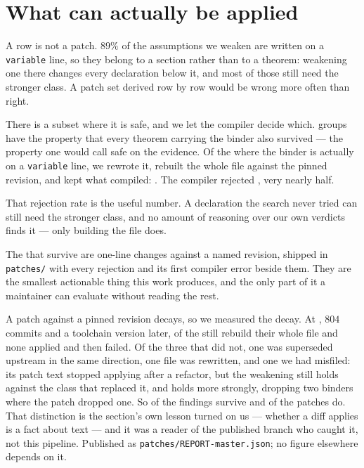 \documentclass[11pt]{article}
\begin{document}
\section{What can actually be applied}\label{sec:patches}

A row is not a patch. \(89\%\) of the assumptions we weaken are written on a
\texttt{variable} line, so they belong to a section rather than to a theorem:
weakening one there changes every declaration below it, and most of those still
need the stronger class. A patch set derived row by row would be wrong more
often than right.

There is a subset where it is safe, and we let the compiler decide which.
\patchGroups{} groups have the property that every theorem carrying the binder
also survived --- the property one would call safe on the evidence. Of the
\patchTested{} where the binder is actually on a \texttt{variable} line, we
rewrote it, rebuilt the whole file against the pinned revision, and kept what
compiled: \textbf{\patchKept{}}. The compiler rejected \patchRejected{}, very nearly
half.

That rejection rate is the useful number. A declaration the search never tried
can still need the stronger class, and no amount of reasoning over our own
verdicts finds it --- only building the file does.

The \patchKept{} that survive are one-line changes against a named revision,
shipped in \texttt{patches/} with every rejection and its first compiler error
beside them. They are the smallest actionable thing this work produces, and the
only part of it a maintainer can evaluate without reading the rest.

A patch against a pinned revision decays, so we measured the decay. At
\texttt{\patchStillHoldRev{}}, $804$ commits and a toolchain version later,
\patchStillHold{} of the \patchKept{} still rebuild their whole file and none
applied and then failed. Of the three that did not, one was superseded upstream
in the same direction, one file was rewritten, and one we had misfiled: its
patch text stopped applying after a refactor, but the weakening still holds
against the class that replaced it, and holds more strongly, dropping two
binders where the patch dropped one. So \patchFindingsHold{} of the findings
survive and \patchStillHold{} of the patches do. That distinction is the
section's own lesson turned on us --- whether a diff applies is a fact about
text --- and it was a reader of the published branch who caught it, not this
pipeline. Published as \texttt{patches/REPORT-master.json}; no figure elsewhere
depends on it.
\end{document}

